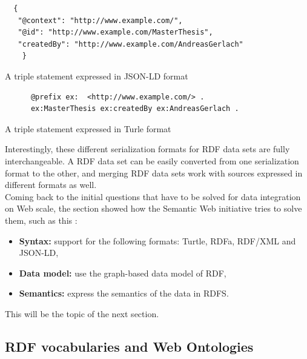 \begin{listing}[H]
	\begin{verbatim}
  {
   "@context": "http://www.example.com/",
   "@id": "http://www.example.com/MasterThesis",
   "createdBy": "http://www.example.com/AndreasGerlach"
 	}
	\end{verbatim}
\caption{A triple statement expressed in \gls{JSON-LD} format}
\label{lst:jsonld_meta_data}
\end{listing}

\begin{listing}[H]
	\begin{verbatim}
	  @prefix ex:  <http://www.example.com/> .
	  ex:MasterThesis ex:createdBy ex:AndreasGerlach .
	\end{verbatim}
\caption{A triple statement expressed in Turle format}
\label{lst:turtle_meta_data}
\end{listing}

Interestingly, these different serialization formats for \gls{RDF} data sets are fully interchangeable. A \gls{RDF} data set can be easily converted from one serialization format to the other, and merging \gls{RDF} data sets work with sources expressed in different formats as well. \\

Coming back to the initial questions that have to be solved for data integration on Web scale, the section showed how the Semantic Web initiative tries to solve them, such as this \citep[pg.23-25]{antoniou2012semantic}: \@

\begin{itemize}
	\item \textbf{Syntax:} support for the following formats: Turtle, \gls{RDFa}, \gls{RDF}/\gls{XML} and \gls{JSON-LD},
	\item \textbf{Data model:} use the graph-based data model of \gls{RDF},
	\item \textbf{Semantics:} express the semantics of the data in \gls{RDFS}.
\end{itemize}

This will be the topic of the next section.


\subsection{\gls{RDF} vocabularies and Web Ontologies}
\label{sec:semantic_vocab_ontologies}

